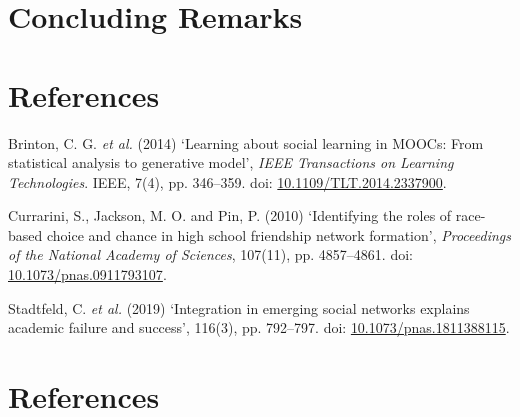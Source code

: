 \documentclass[11pt,preprint, authoryear]{article}
\numberwithin{equation}{section}
\numberwithin{figure}{section}
\numberwithin{table}{section}
\begin{document}
\newpage

\section{\texorpdfstring{Concluding Remarks
\label{Concl}}{Concluding Remarks }}\label{concluding-remarks}

\newpage

\section{References}\label{references}

\hypertarget{refs}{}
\hypertarget{ref-Brinton2014}{}
Brinton, C. G. \emph{et al.} (2014) `Learning about social learning in
MOOCs: From statistical analysis to generative model', \emph{IEEE
Transactions on Learning Technologies}. IEEE, 7(4), pp. 346--359. doi:
\href{https://doi.org/10.1109/TLT.2014.2337900}{10.1109/TLT.2014.2337900}.

\hypertarget{ref-Currarini2010}{}
Currarini, S., Jackson, M. O. and Pin, P. (2010) `Identifying the roles
of race-based choice and chance in high school friendship network
formation', \emph{Proceedings of the National Academy of Sciences},
107(11), pp. 4857--4861. doi:
\href{https://doi.org/10.1073/pnas.0911793107}{10.1073/pnas.0911793107}.

\hypertarget{ref-Stadtfeld2019}{}
Stadtfeld, C. \emph{et al.} (2019) `Integration in emerging social
networks explains academic failure and success', 116(3), pp. 792--797.
doi:
\href{https://doi.org/10.1073/pnas.1811388115}{10.1073/pnas.1811388115}.

\newcommand\wordcount{
    \immediate\write18{texcount -sub=section \jobname.tex  | grep "Section" |     sed -e 's/+.*//' | sed -n \thesection p > 'count.txt'}
(words)}

\section*{References}
\end{document}
